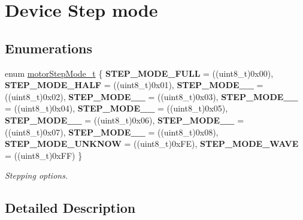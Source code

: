 \hypertarget{group___device___step__mode}{}\section{Device Step mode}
\label{group___device___step__mode}
\subsection*{Enumerations}
\begin{DoxyCompactItemize}
\item 
\mbox{\label{group___device___step__mode_gaa8024e6a2453b22a104bd0a8a364dd80}} 
enum \mbox{\hyperlink{group___device___step__mode_gaa8024e6a2453b22a104bd0a8a364dd80}{motor\+Step\+Mode\+\_\+t}} \{ \newline
{\bfseries S\+T\+E\+P\+\_\+\+M\+O\+D\+E\+\_\+\+F\+U\+LL} = ((uint8\+\_\+t)0x00), 
{\bfseries S\+T\+E\+P\+\_\+\+M\+O\+D\+E\+\_\+\+H\+A\+LF} = ((uint8\+\_\+t)0x01), 
{\bfseries S\+T\+E\+P\+\_\+\+M\+O\+D\+E\+\_\+\_} = ((uint8\+\_\+t)0x02), 
{\bfseries S\+T\+E\+P\+\_\+\+M\+O\+D\+E\+\_\+\_} = ((uint8\+\_\+t)0x03), 
\newline
{\bfseries S\+T\+E\+P\+\_\+\+M\+O\+D\+E\+\_\+\_} = ((uint8\+\_\+t)0x04), 
{\bfseries S\+T\+E\+P\+\_\+\+M\+O\+D\+E\+\_\+\_} = ((uint8\+\_\+t)0x05), 
{\bfseries S\+T\+E\+P\+\_\+\+M\+O\+D\+E\+\_\+\_} = ((uint8\+\_\+t)0x06), 
{\bfseries S\+T\+E\+P\+\_\+\+M\+O\+D\+E\+\_\+\_} = ((uint8\+\_\+t)0x07), 
\newline
{\bfseries S\+T\+E\+P\+\_\+\+M\+O\+D\+E\+\_\+\_} = ((uint8\+\_\+t)0x08), 
{\bfseries S\+T\+E\+P\+\_\+\+M\+O\+D\+E\+\_\+\+U\+N\+K\+N\+OW} = ((uint8\+\_\+t)0x\+FE), 
{\bfseries S\+T\+E\+P\+\_\+\+M\+O\+D\+E\+\_\+\+W\+A\+VE} = ((uint8\+\_\+t)0x\+FF)
 \}
\begin{DoxyCompactList}\small\item\em Stepping options. \end{DoxyCompactList}\end{DoxyCompactItemize}


\subsection{Detailed Description}
